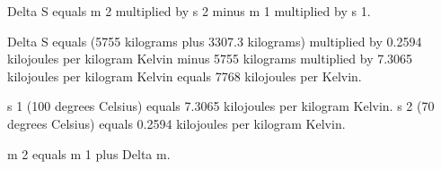 Delta S equals m 2 multiplied by s 2 minus m 1 multiplied by s 1.  

Delta S equals (5755 kilograms plus 3307.3 kilograms) multiplied by 0.2594 kilojoules per kilogram Kelvin minus 5755 kilograms multiplied by 7.3065 kilojoules per kilogram Kelvin equals 7768 kilojoules per Kelvin.  

s 1 (100 degrees Celsius) equals 7.3065 kilojoules per kilogram Kelvin.  
s 2 (70 degrees Celsius) equals 0.2594 kilojoules per kilogram Kelvin.  

m 2 equals m 1 plus Delta m.